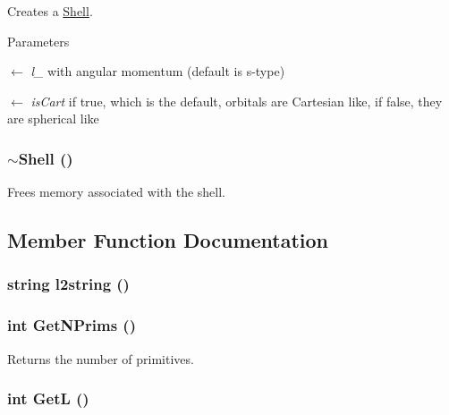 Creates a \hyperlink{classJKBuilder_1_1Shell}{Shell}. 
\begin{DoxyParams}{Parameters}
\item[\mbox{$\leftarrow$} {\em l\_\-}]with angular momentum (default is s-\/type) \item[\mbox{$\leftarrow$} {\em isCart}]if true, which is the default, orbitals are Cartesian like, if false, they are spherical like \end{DoxyParams}
\hypertarget{classJKBuilder_1_1Shell_aafdad0fa9de137c286b786898f3ba361}{
\subsubsection[{$\sim$Shell}]{\setlength{\rightskip}{0pt plus 5cm}$\sim${\bf Shell} ()}}
\label{classJKBuilder_1_1Shell_aafdad0fa9de137c286b786898f3ba361}


Frees memory associated with the shell. 

\subsection{Member Function Documentation}
\hypertarget{classJKBuilder_1_1Shell_abf69d46e0ac3418b1e7926c9e18def95}{
\subsubsection[{l2string}]{\setlength{\rightskip}{0pt plus 5cm}string l2string ()}}
\label{classJKBuilder_1_1Shell_abf69d46e0ac3418b1e7926c9e18def95}
\hypertarget{classJKBuilder_1_1Shell_abc886cd4e35d3c56a0250b7d06986f61}{
\subsubsection[{GetNPrims}]{\setlength{\rightskip}{0pt plus 5cm}int GetNPrims ()}}
\label{classJKBuilder_1_1Shell_abc886cd4e35d3c56a0250b7d06986f61}


Returns the number of primitives. \hypertarget{classJKBuilder_1_1Shell_a7cc8fc5bc043267a7b47e69503e0e308}{
\subsubsection[{GetL}]{\setlength{\rightskip}{0pt plus 5cm}int GetL ()}}
\label{classJKBuilder_1_1Shell_a7cc8fc5bc043267a7b47e69503e0e308}


